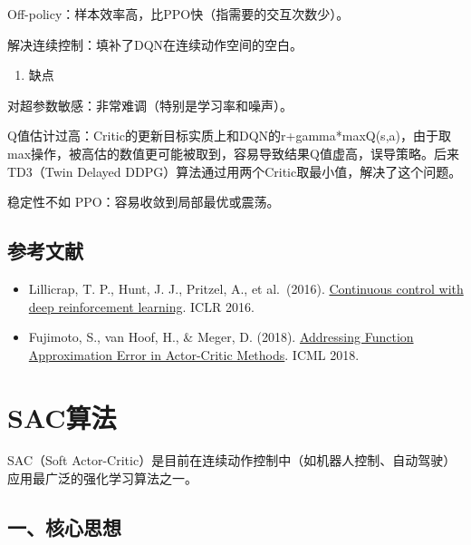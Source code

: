 Off-policy：样本效率高，比PPO快（指需要的交互次数少）。

解决连续控制：填补了DQN在连续动作空间的空白。

\begin{enumerate}
\def\labelenumi{\arabic{enumi}.}
\setcounter{enumi}{1}
\tightlist
\item
  缺点
\end{enumerate}

对超参数敏感：非常难调（特别是学习率和噪声）。

Q值估计过高：Critic的更新目标实质上和DQN的r+gamma*maxQ(s,a)，由于取max操作，被高估的数值更可能被取到，容易导致结果Q值虚高，误导策略。后来TD3（Twin Delayed DDPG）算法通过用两个Critic取最小值，解决了这个问题。

稳定性不如 PPO：容易收敛到局部最优或震荡。

\hypertarget{ux53c2ux8003ux6587ux732e-60}{%
\subsection{参考文献}\label{ux53c2ux8003ux6587ux732e-60}}

\vspace{0.25em}
\begin{itemize}
\tightlist
\item
  Lillicrap, T. P., Hunt, J. J., Pritzel, A., et al.~(2016). \href{https://arxiv.org/abs/1509.02971}{Continuous control with deep reinforcement learning}. ICLR 2016.
\item
  Fujimoto, S., van Hoof, H., \& Meger, D. (2018). \href{https://proceedings.mlr.press/v80/fujimoto18a.html}{Addressing Function Approximation Error in Actor-Critic Methods}. ICML 2018.
\end{itemize}

\clearpage

\hypertarget{sacux7b97ux6cd5}{%
\section{SAC算法}\label{sacux7b97ux6cd5}}

SAC（Soft Actor-Critic）是目前在连续动作控制中（如机器人控制、自动驾驶）应用最广泛的强化学习算法之一。

\hypertarget{ux4e00ux6838ux5fc3ux601dux60f3-4}{%
\subsection{一、核心思想}\label{ux4e00ux6838ux5fc3ux601dux60f3-4}}


